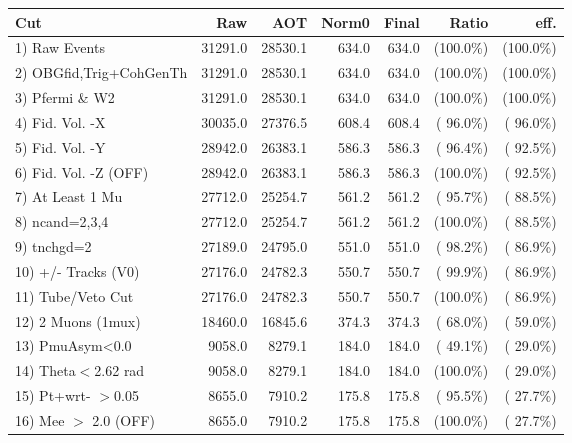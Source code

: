  \begin{table}[h!]\centering
 \begin{tabular}{||l||r|r|r|r|r|r||}
 \hline
 \hline
 Cut & Raw & AOT & Norm0 & Final & Ratio & eff.       \\
 \hline
  1) Raw Events           &      31291.0 &      28530.1 &        634.0 &        634.0 & (100.0\%) & (100.0\%) \\
  2) OBGfid,Trig+CohGenTh &      31291.0 &      28530.1 &        634.0 &        634.0 & (100.0\%) & (100.0\%) \\
  3) Pfermi \& W2         &      31291.0 &      28530.1 &        634.0 &        634.0 & (100.0\%) & (100.0\%) \\
  4) Fid. Vol. -X         &      30035.0 &      27376.5 &        608.4 &        608.4 & ( 96.0\%) & ( 96.0\%) \\
  5) Fid. Vol. -Y         &      28942.0 &      26383.1 &        586.3 &        586.3 & ( 96.4\%) & ( 92.5\%) \\
  6) Fid. Vol. -Z (OFF)   &      28942.0 &      26383.1 &        586.3 &        586.3 & (100.0\%) & ( 92.5\%) \\
  7) At Least 1 Mu        &      27712.0 &      25254.7 &        561.2 &        561.2 & ( 95.7\%) & ( 88.5\%) \\
  8) ncand=2,3,4          &      27712.0 &      25254.7 &        561.2 &        561.2 & (100.0\%) & ( 88.5\%) \\
  9) tnchgd=2             &      27189.0 &      24795.0 &        551.0 &        551.0 & ( 98.2\%) & ( 86.9\%) \\
 10) +/- Tracks (V0)      &      27176.0 &      24782.3 &        550.7 &        550.7 & ( 99.9\%) & ( 86.9\%) \\
 11) Tube/Veto Cut        &      27176.0 &      24782.3 &        550.7 &        550.7 & (100.0\%) & ( 86.9\%) \\
 12) 2 Muons (1mux)       &      18460.0 &      16845.6 &        374.3 &        374.3 & ( 68.0\%) & ( 59.0\%) \\
 13) PmuAsym<0.0          &       9058.0 &       8279.1 &        184.0 &        184.0 & ( 49.1\%) & ( 29.0\%) \\
 14) Theta$<$2.62 rad     &       9058.0 &       8279.1 &        184.0 &        184.0 & (100.0\%) & ( 29.0\%) \\
 15) Pt+wrt- $>$0.05      &       8655.0 &       7910.2 &        175.8 &        175.8 & ( 95.5\%) & ( 27.7\%) \\
 16) Mee $>$ 2.0  (OFF)   &       8655.0 &       7910.2 &        175.8 &        175.8 & (100.0\%) & ( 27.7\%) \\

\end{tabular}
\end{table}
